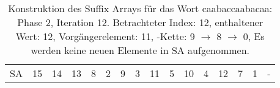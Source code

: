 \begin{table}[H]
\begin{adjustbox}{max width=\textwidth}
\begin{tabular}{lccccccccccccccc}
\multicolumn{1}{l|}{SA}      & \multicolumn{1}{c|}{15} & 14 & \multicolumn{1}{c|}{13} & \multicolumn{1}{c|}{8}     & \multicolumn{1}{c|}{2}      & \multicolumn{1}{c|}{9}    & \multicolumn{1}{c|}{3}     & \multicolumn{1}{c|}{11} & \multicolumn{1}{c|}{5}   & 10 & \multicolumn{1}{c|}{4}  & \cellcolor[HTML]{\green}12 & 7  & 1  & - 
\end{tabular}
\end{adjustbox}

\caption[Konstruktion des Suffix Arrays für das Wort caabaccaabacaa: Phase 2, Iteration 12]{Konstruktion des Suffix Arrays für das Wort caabaccaabacaa: Phase 2, Iteration 12. Betrachteter Index: 12, enthaltener Wert: 12, Vorgängerelement: 11, \prevpointer-Kette: 9 $\rightarrow$ 8 $\rightarrow$ 0, Es werden keine neuen Elemente in SA aufgenommen.}
\label{table_complex_example_2_12} 
\end{table}

